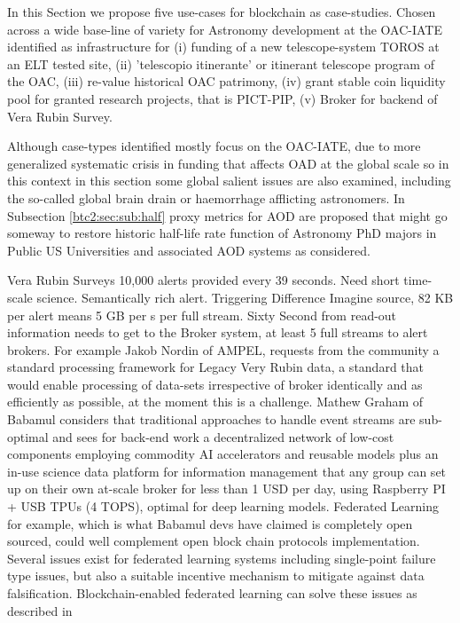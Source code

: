 \documentclass[final,5p,times,twocolumn,authoryear]{elsarticle}
\begin{document}
In this Section we propose five use-cases for blockchain as case-studies. Chosen across a wide base-line of variety for Astronomy development at the OAC-IATE identified as infrastructure for (i) funding of a new telescope-system TOROS at an ELT tested site, (ii) 'telescopio itinerante' or itinerant telescope program of the OAC, (iii) re-value historical OAC patrimony, (iv) grant stable coin liquidity pool for granted research projects, that is PICT-PIP, (v) Broker for backend of Vera Rubin Survey. 

Although case-types identified mostly focus on  the OAC-IATE, due to more generalized systematic crisis in funding that affects OAD at the global scale so in this context in this section some global salient issues are also examined, including the so-called global brain drain or haemorrhage afflicting astronomers. In Subsection \ref{btc2:sec:sub:half} proxy metrics for AOD are proposed that might go someway to restore historic half-life rate function of Astronomy PhD majors in Public US Universities and associated AOD systems as considered. 

Vera Rubin Surveys 10,000 alerts provided every 39 seconds. Need short time-scale science. Semantically rich alert. Triggering Difference Imagine source, 82 KB per alert means 5 GB per s per full stream. Sixty Second from read-out information needs to get to the Broker system, at least 5 full streams to alert brokers.   For example  Jakob Nordin of AMPEL, requests from the community a standard processing framework for Legacy Very Rubin data, a standard that would enable processing of data-sets irrespective of broker identically and as efficiently as possible, at the moment this is a challenge.  Mathew Graham of Babamul considers that traditional approaches to handle event streams are sub-optimal and sees for back-end work a decentralized network of low-cost components employing commodity AI accelerators and reusable models plus an in-use science data platform for information management that any group can set up on their own at-scale broker for less than 1 USD per day, using Raspberry PI + USB TPUs (4 TOPS), optimal for deep learning models.  Federated Learning for example, which is what Babamul devs have claimed is completely open sourced, could well complement open block chain protocols implementation. Several issues exist for federated learning systems including single-point failure type issues, but also a suitable incentive mechanism to mitigate against data falsification. Blockchain-enabled federated learning can solve these issues as described in 
\end{document}
